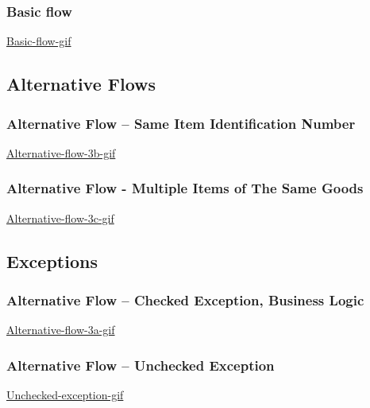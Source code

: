 \documentclass[a4paper]{scrreprt}
\begin{document}
\subsubsection*{Basic flow}
\href{https://github.com/VincentFerrigan/kth-iv1350-object-oriented-design/tree/main#basic-flow}{Basic-flow-gif}

\subsection*{Alternative Flows}
\subsubsection*{Alternative Flow -- Same Item Identification Number}
\href{https://github.com/VincentFerrigan/kth-iv1350-object-oriented-design#alternative-flow---same-item-identification-number}{Alternative-flow-3b-gif}

\subsubsection*{Alternative Flow - Multiple Items of The Same Goods}
\href{https://github.com/VincentFerrigan/kth-iv1350-object-oriented-design#alternative-flow---multiple-items-of-the-same-goods}{Alternative-flow-3c-gif}

\subsection*{Exceptions}
\subsubsection*{Alternative Flow -- Checked Exception, Business Logic}
\href{https://github.com/VincentFerrigan/kth-iv1350-object-oriented-design#alternative-flow---checked-exception-business-logic}{Alternative-flow-3a-gif}

\subsubsection*{Alternative Flow -- Unchecked Exception}
\href{https://github.com/VincentFerrigan/kth-iv1350-object-oriented-design#alternative-flow---unchecked-exception}{Unchecked-exception-gif}
\end{document}
